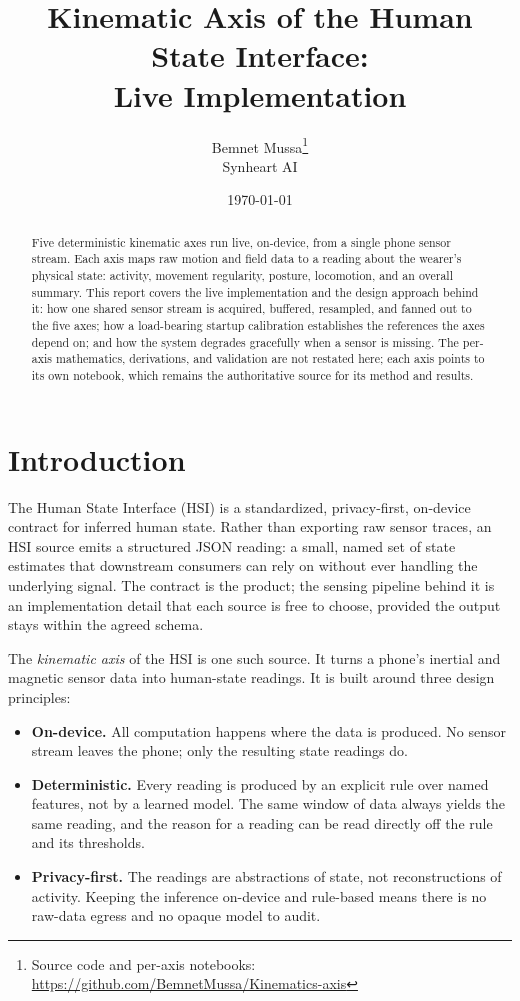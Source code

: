 \documentclass[11pt]{article}
\title{Kinematic Axis of the Human State Interface:\\ Live Implementation}
\author{Bemnet Mussa\thanks{Source code and per-axis notebooks: \url{https://github.com/BemnetMussa/Kinematics-axis}} \\ Synheart AI}
\date{\today}
\begin{document}
\maketitle

\begin{abstract}
\noindent
Five deterministic kinematic axes run live, on-device, from a single phone sensor
stream. Each axis maps raw motion and field data to a reading about the wearer's
physical state: activity, movement regularity, posture, locomotion, and an overall
summary. This report covers the live implementation and the design approach behind
it: how one shared sensor stream is acquired, buffered, resampled, and fanned out to
the five axes; how a load-bearing startup calibration establishes the references the
axes depend on; and how the system degrades gracefully when a sensor is missing. The
per-axis mathematics, derivations, and validation are not restated here; each axis
points to its own notebook, which remains the authoritative source for its method and
results.
\end{abstract}

\section{Introduction}

The Human State Interface (HSI) is a standardized, privacy-first, on-device contract
for inferred human state. Rather than exporting raw sensor traces, an HSI source emits
a structured JSON reading: a small, named set of state estimates that downstream
consumers can rely on without ever handling the underlying signal. The contract is the
product; the sensing pipeline behind it is an implementation detail that each source is
free to choose, provided the output stays within the agreed schema.

The \emph{kinematic axis} of the HSI is one such source. It turns a phone's inertial
and magnetic sensor data into human-state readings. It is built around three design
principles:

\begin{itemize}
  \item \textbf{On-device.} All computation happens where the data is produced. No
        sensor stream leaves the phone; only the resulting state readings do.
  \item \textbf{Deterministic.} Every reading is produced by an explicit rule over
        named features, not by a learned model. The same window of data always yields
        the same reading, and the reason for a reading can be read directly off the
        rule and its thresholds.
  \item \textbf{Privacy-first.} The readings are abstractions of state, not
        reconstructions of activity. Keeping the inference on-device and rule-based
        means there is no raw-data egress and no opaque model to audit.
\end{itemize}
\end{document}
